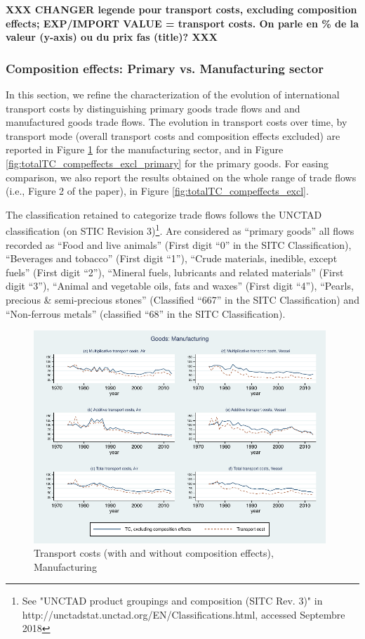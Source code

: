 \documentclass[11pt,twoside, authoryear]{elsarticle}
\begin{document}
\textbf{XXX CHANGER legende pour transport costs, excluding composition effects; EXP/IMPORT VALUE = transport costs. On parle en \% de la valeur (y-axis) ou du prix fas (title)? XXX }

\subsubsection{Composition effects: Primary vs. Manufacturing sector}

In this section, we refine the characterization of the evolution of international transport costs by distinguishing primary goods trade flows and and manufactured goods trade flows. The evolution in transport costs over time, by transport mode (overall transport costs and composition effects excluded) are reported in Figure \ref{fig:totalTC_compeffects_excl_manuf} for the manufacturing sector, and in Figure \ref{fig:totalTC_compeffects_excl_primary} for the primary goods. For easing comparison, we also report the results obtained on the whole range of trade flows (i.e., Figure 2 of the paper), in Figure \ref{fig:totalTC_compeffects_excl}.


The classification retained to categorize trade flows follows the UNCTAD classification (on STIC Revision 3)\footnote{See "UNCTAD product groupings and composition (SITC Rev. 3)" in http://unctadstat.unctad.org/EN/Classifications.html, accessed Septembre 2018}.
Are considered as ``primary goods'' all flows recorded as ``Food and live animals'' (First digit ``0'' in the SITC Classification), ``Beverages and tobacco'' (First digit ``1''), ``Crude materials, inedible, except fuels'' (First digit ``2''), ``Mineral fuels, lubricants and related materials'' (First digit ``3''), ``Animal and vegetable oils, fats and waxes'' (First digit ``4''), ``Pearls, precious \& semi-precious stones'' (Classified ``667'' in the SITC Classification) and ``Non-ferrous metals'' (classified ``68'' in the SITC Classification).


\begin{figure}[htbp]
\caption{Transport costs (with and without composition effects), Manufacturing}
\label{fig:totalTC_compeffects_excl_manuf}
\begin{center}
\includegraphics[height=8cm] {graph_composition_manuf.pdf}
\end{center}
\end{figure}
\end{document}
